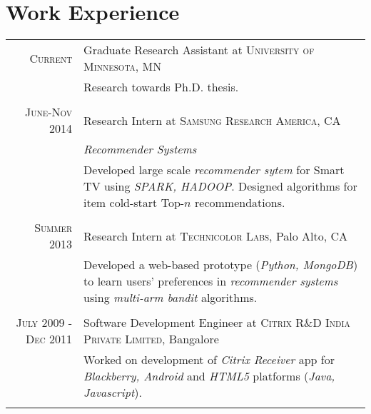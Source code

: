 \documentclass[a4paper,10pt]{article}
\begin{document}
\section{Work Experience}
\begin{tabular}{r|p{11cm}}
  
  \textsc{Current} & Graduate Research Assistant at \textsc{University of
Minnesota}, MN\\
  & \footnotesize{Research towards Ph.D. thesis.} \\\multicolumn{2}{c}{} \\
 

  \textsc{June-Nov 2014} & Research Intern at \textsc{Samsung Research America}, CA\\
                       &\emph{Recommender Systems}\\
                       &\footnotesize{Developed large scale \textit{recommender
                       sytem} for Smart TV using
                     \textit{SPARK, HADOOP}. Designed algorithms for 
                   item cold-start Top-$n$ recommendations.}\\\multicolumn{2}{c}{} \\

  \textsc{Summer 2013} & Research Intern at \textsc{Technicolor Labs}, Palo Alto, CA \\
                       &\footnotesize{ Developed a web-based  prototype (\emph{Python,
                 MongoDB}) to learn users'
                   preferences in \emph{recommender systems} using
               \emph{multi-arm bandit} algorithms.} \\\multicolumn{2}{c}{} \\ %

  \textsc{July 2009 - Dec 2011} & Software Development Engineer at
                \textsc{Citrix R\&D India Private Limited}, Bangalore \\
                       &\footnotesize{ Worked on development of  \emph{Citrix
                 Receiver} app for
                   \emph{Blackberry, Android}  and \emph{HTML5} platforms
                   (\emph{Java, Javascript}).
                   }\\\multicolumn{2}{c}{} \\  


\end{tabular}
\end{document}
